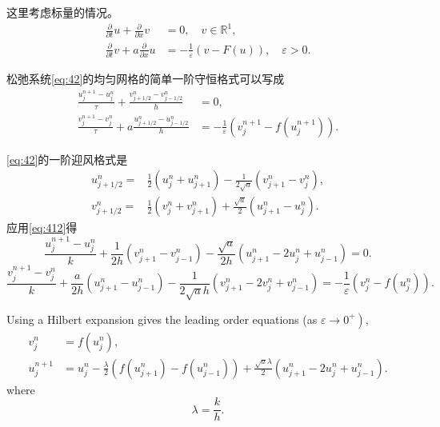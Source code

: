 \documentclass[12pt]{article}
\begin{document}
这里考虑标量的情况。
\begin{equation}
	\begin{aligned}
		\frac{\partial}{\partial t} {u}+\frac{\partial}{\partial x} {v}&=0, \quad {v} \in \mathbb{R}^{1}, \\
		\frac{\partial}{\partial t} {v}+{a} \frac{\partial}{\partial x} {u}&=-\frac{1}{\varepsilon}({v}-F({u})), \quad \varepsilon>0.
	\end{aligned}
	\label{eq:42}
\end{equation}

松弛系统\cref{eq:42}的均匀网格的简单一阶守恒格式可以写成
\begin{equation}
	\begin{aligned}
		\frac{u_{j}^{n+1}-u_{j}^{n}}{\tau}+ \frac{v_{j+1 / 2}^{n}-v_{j-1 / 2}^{n}}{h}&=0, \\
		\frac{v_{j}^{n+1}-v_{j}^{n}}{\tau}+a \frac{u_{j+1 / 2}^{n}-u_{j-1 / 2}^{n}}{h} &=-\frac{1}{\varepsilon}\left(v_{j}^{n+1}-f\left(u_{j}^{n+1}\right)\right).
		\end{aligned}
		\label{eq:412}
\end{equation}


\cref{eq:42}的一阶迎风格式是
\begin{equation}
	\begin{aligned}
		u_{j+1 / 2}^{n}=&\frac{1}{2}\left(u_{j}^{n}+u_{j+1}^{n}\right)-\frac{1}{2 \sqrt{a}}\left(v_{j+1}^{n}-v_{j}^{n}\right), \\
		v_{j+1 / 2}^{n}=&\frac{1}{2}\left(v_{j}^{n}+v_{j+1}^{n}\right)+\frac{\sqrt{a}}{2}\left(u_{j+1}^{n}-u_{j}^{n}\right).
	\end{aligned}
\end{equation}
应用\cref{eq:412}得
\begin{equation}
	\frac{u_{j}^{n+1}-u_{j}^{n}}{k}+\frac{1}{2 h}\left(v_{j+1}^{n}-v_{j-1}^{n}\right)-\frac{\sqrt{a}}{2 h}\left(u_{j+1}^{n}-2 u_{j}^{n}+u_{j-1}^{n}\right)=0.
\end{equation}
\begin{equation}
	\frac{v_{j}^{n+1}-v_{j}^{n}}{k} +\frac{a}{2 h}\left(u_{j+1}^{n}-u_{j-1}^{n}\right)-\frac{1}{2 \sqrt{a} h}\left(v_{j+1}^{n}-2 v_{j}^{n}+v_{j-1}^{n}\right)=-\frac{1}{\varepsilon}\left(v_{j}^{n}-f\left(u_{j}^{n}\right)\right).
\end{equation}


Using a Hilbert expansion gives the leading order equations (as $\left.\varepsilon \rightarrow 0^{+}\right)$,
\begin{equation}
	\begin{aligned}
		v_{j}^{n} &=f\left(u_{j}^{n}\right), \\
		u_{j}^{n+1} &=u_{j}^{n}-\frac{\lambda}{2}\left(f\left(u_{j+1}^{n}\right)-f\left(u_{j-1}^{n}\right)\right)+\frac{\sqrt{a} \lambda}{2}\left(u_{j+1}^{n}-2 u_{j}^{n}+u_{j-1}^{n}\right).
	\end{aligned}
	\label{eq:43}
\end{equation}
where
\begin{equation}
	\lambda=\frac{k}{h}.
\end{equation}
\end{document}
